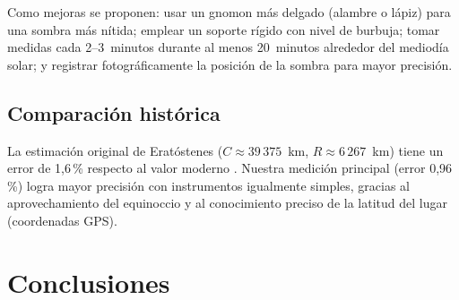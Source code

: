 Como mejoras se proponen: usar un gnomon más delgado (alambre o lápiz)
para una sombra más nítida; emplear un soporte rígido con nivel de
burbuja; tomar medidas cada 2--3~minutos durante al menos 20~minutos
alrededor del mediodía solar; y registrar fotográficamente la posición
de la sombra para mayor precisión.

\subsection{Comparación histórica}

La estimación original de Eratóstenes ($C \approx 39\,375$~km,
$R \approx 6\,267$~km) tiene un error de 1{,}6\,\% respecto al
valor moderno \citep{Britannica2024}.
Nuestra medición principal (error 0{,}96\,\%) logra mayor
precisión con instrumentos igualmente simples, gracias al
aprovechamiento del equinoccio y al conocimiento preciso de la latitud
del lugar (coordenadas GPS).

\section{Conclusiones}

